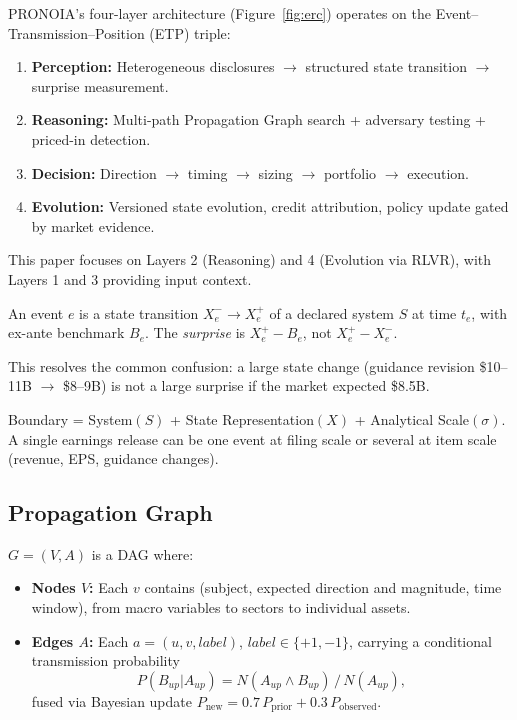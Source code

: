 \documentclass[sigconf, anonymous, review]{acmart}
\begin{document}
PRONOIA's four-layer architecture (Figure~\ref{fig:erc}) operates on the Event--Transmission--Position (ETP) triple:

\begin{enumerate}
    \item \textbf{Perception:} Heterogeneous disclosures $\to$ structured state transition $\to$ surprise measurement.
    \item \textbf{Reasoning:} Multi-path Propagation Graph search + adversary testing + priced-in detection.
    \item \textbf{Decision:} Direction $\to$ timing $\to$ sizing $\to$ portfolio $\to$ execution.
    \item \textbf{Evolution:} Versioned state evolution, credit attribution, policy update gated by market evidence.
\end{enumerate}

This paper focuses on Layers 2 (Reasoning) and 4 (Evolution via RLVR), with Layers 1 and 3 providing input context.

\begin{definition}[Event]
An event $e$ is a state transition $X_e^- \to X_e^+$ of a declared system $S$ at time $t_e$, with ex-ante benchmark $B_e$. The \emph{surprise} is $X_e^+ - B_e$, not $X_e^+ - X_e^-$.
\end{definition}

This resolves the common confusion: a large state change (guidance revision \$10--11B $\to$ \$8--9B) is not a large surprise if the market expected \$8.5B.

\begin{definition}
Boundary = System$(S)$ + State Representation$(X)$ + Analytical Scale$(\sigma)$. A single earnings release can be one event at filing scale or several at item scale (revenue, EPS, guidance changes).
\end{definition}

\subsection{Propagation Graph}

$G = (V, A)$ is a DAG where:
\begin{itemize}
    \item \textbf{Nodes $V$:} Each $v$ contains (subject, expected direction and magnitude, time window), from macro variables to sectors to individual assets.
    \item \textbf{Edges $A$:} Each $a = (u,v,label)$, $label \in \{+1, -1\}$, carrying a conditional transmission probability
    \[ P(B_{up}|A_{up}) = N(A_{up} \wedge B_{up})\,/\,N(A_{up}), \]
    fused via Bayesian update $P_{\mathrm{new}} = 0.7\,P_{\mathrm{prior}} + 0.3\,P_{\mathrm{observed}}$.
\end{itemize}
\end{document}
